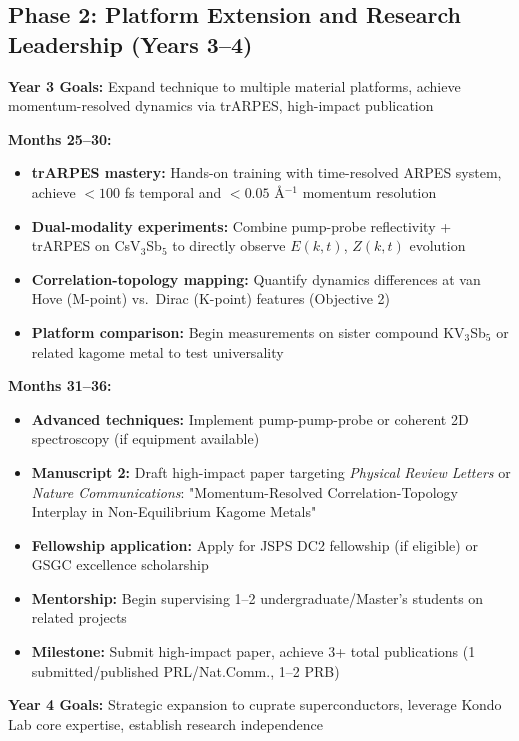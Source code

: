 \documentclass[12pt,a4paper]{article}
\begin{document}
\subsection{Phase 2: Platform Extension and Research Leadership (Years 3--4)}

\textbf{Year 3 Goals:} Expand technique to multiple material platforms, achieve momentum-resolved dynamics via trARPES, high-impact publication

\textbf{Months 25--30:}
\begin{itemize}
    \item \textbf{trARPES mastery:} Hands-on training with time-resolved ARPES system, achieve $<100$ fs temporal and $<0.05$ Å$^{-1}$ momentum resolution
    \item \textbf{Dual-modality experiments:} Combine pump-probe reflectivity + trARPES on CsV$_3$Sb$_5$ to directly observe $E(k,t)$, $Z(k,t)$ evolution
    \item \textbf{Correlation-topology mapping:} Quantify dynamics differences at van Hove (M-point) vs.~Dirac (K-point) features (Objective 2)
    \item \textbf{Platform comparison:} Begin measurements on sister compound KV$_3$Sb$_5$ or related kagome metal to test universality
\end{itemize}

\textbf{Months 31--36:}
\begin{itemize}
    \item \textbf{Advanced techniques:} Implement pump-pump-probe or coherent 2D spectroscopy (if equipment available)
    \item \textbf{Manuscript 2:} Draft high-impact paper targeting \textit{Physical Review Letters} or \textit{Nature Communications}: "Momentum-Resolved Correlation-Topology Interplay in Non-Equilibrium Kagome Metals"
    \item \textbf{Fellowship application:} Apply for JSPS DC2 fellowship (if eligible) or GSGC excellence scholarship
    \item \textbf{Mentorship:} Begin supervising 1--2 undergraduate/Master's students on related projects
    \item \textbf{Milestone:} Submit high-impact paper, achieve 3+ total publications (1 submitted/published PRL/Nat.Comm., 1--2 PRB)
\end{itemize}

\textbf{Year 4 Goals:} Strategic expansion to cuprate superconductors, leverage Kondo Lab core expertise, establish research independence
\end{document}
